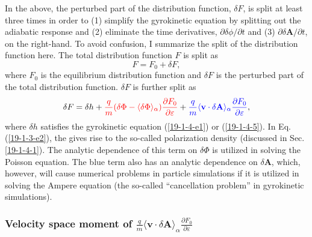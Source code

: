 \documentclass{llncs}
\newcommand{\tmcolor}[2]{{\color{#1}{#2}}}
\begin{document}
In the above, the perturbed part of the distribution function, $\delta F$, is
split at least three times in order to (1) simplify the gyrokinetic equation
by splitting out the adiabatic response and (2) eliminate the time
derivatives, $\partial \delta \phi / \partial t$ and (3) $\partial \delta
\mathbf{A}/ \partial t$, on the right-hand. To avoid confusion, I summarize
the split of the distribution function here. The total distribution function
$F$ is split as
\begin{equation}
  \label{19-1-4-6} F = F_0 + \delta F,
\end{equation}
where $F_0$ is the equilibrium distribution function and $\delta F$ is the
perturbed part of the total distribution function. $\delta F$ is further split
as
\begin{equation}
  \label{19-1-3-e2} \delta F = \delta h + \tmcolor{red}{\frac{q}{m} (\delta
  \Phi - \langle \delta \Phi \rangle_{\alpha}) \frac{\partial F_0}{\partial
  \varepsilon}} + \tmcolor{blue}{\frac{q}{m} \langle \mathbf{v} \cdot \delta
  \mathbf{A} \rangle_{\alpha} \frac{\partial F_0}{\partial \varepsilon}},
\end{equation}
where $\delta h$ satisfies the gyrokinetic equation (\ref{19-1-4-e1}) or
(\ref{19-1-4-5}). In Eq. (\ref{19-1-3-e2}), the \tmcolor{red}{red term} gives
rise to the so-called polarization density (discussed in Sec. \ref{19-1-4-1}).
The analytic dependence of this term on $\delta \Phi$ is utilized in solving
the Poisson equation. The blue term also has an analytic dependence on $\delta
\mathbf{A}$, which, however, will cause numerical problems in particle
simulations if it is utilized in solving the Ampere equation (the so-called
``cancellation problem'' in gyrokinetic simulations).

\subsubsection{Velocity space moment of $\frac{q}{m} \langle \mathbf{v} \cdot
\delta \mathbf{A} \rangle_{\alpha} \frac{\partial F_0}{\partial
\varepsilon}$}\label{19-3-21-8}
\end{document}
